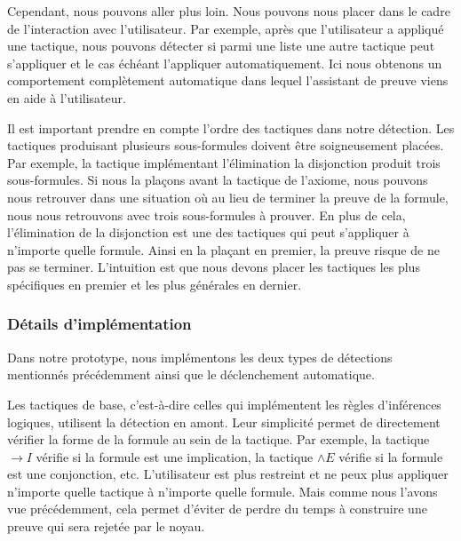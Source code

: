 \documentclass[french,titlepage]{article}
\begin{document}
Cependant, nous pouvons aller plus loin. Nous pouvons nous placer dans le cadre de l'interaction avec l'utilisateur. Par exemple, après que l'utilisateur a appliqué une tactique, nous pouvons détecter si parmi une liste une autre tactique peut s'appliquer et le cas échéant l'appliquer automatiquement. Ici nous obtenons un comportement complètement automatique dans lequel l'assistant de preuve viens en aide à l'utilisateur.

Il est important prendre en compte l'ordre des tactiques dans notre détection. Les tactiques produisant plusieurs sous-formules doivent être soigneusement placées. Par exemple, la tactique implémentant l'élimination la disjonction produit trois sous-formules. Si nous la plaçons avant la tactique de l'axiome, nous pouvons nous retrouver dans une situation où au lieu de terminer la preuve de la formule, nous nous retrouvons avec trois sous-formules à prouver. En plus de cela, l'élimination de la disjonction est une des tactiques qui peut s'appliquer à n'importe quelle formule. Ainsi en la plaçant en premier, la preuve risque de ne pas se terminer. L'intuition est que nous devons placer les tactiques les plus spécifiques en premier et les plus générales en dernier.

\subsubsection{Détails d'implémentation}
Dans notre prototype, nous implémentons les deux types de détections mentionnés précédemment ainsi que le déclenchement automatique.

Les tactiques de base, c'est-à-dire celles qui implémentent les règles d'inférences logiques, utilisent la détection en amont. Leur simplicité permet de directement vérifier la forme de la formule au sein de la tactique. Par exemple, la tactique $\to I$ vérifie si la formule est une implication, la tactique $\land E$ vérifie si la formule est une conjonction, etc. L'utilisateur est plus restreint et ne peux plus appliquer n'importe quelle tactique à n'importe quelle formule. Mais comme nous l'avons vue précédemment, cela permet d'éviter de perdre du temps à construire une preuve qui sera rejetée par le noyau.
\end{document}
